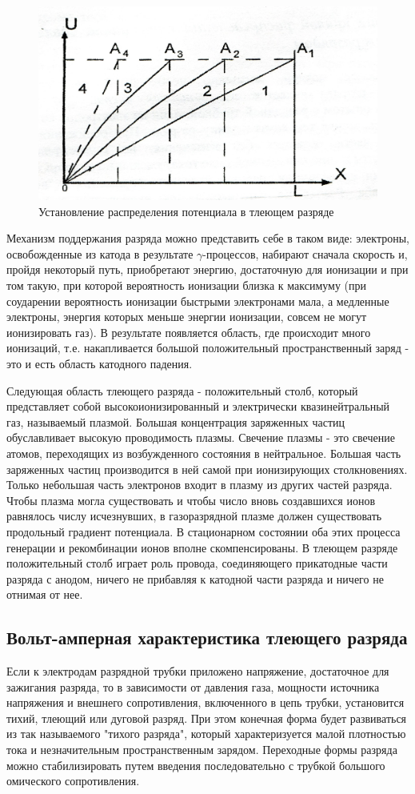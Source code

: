   \begin{figure}[h!]
	\centering
	\includegraphics[width=0.5\linewidth]{fig/img1.jpg}
	\caption{Установление распределения потенциала в тлеющем разряде}
	\label{fig:1}
\end{figure}

Механизм поддержания разряда можно представить себе в таком виде: электроны, освобожденные из катода в результате 
$\gamma$-процессов, набирают сначала скорость и, пройдя некоторый путь, приобретают энергию, достаточную для 
ионизации и при том такую, при которой вероятность ионизации близка к максимуму (при соударении вероятность ионизации 
быстрыми электронами мала, а медленные электроны, энергия которых меньше энергии ионизации, совсем не могут 
ионизировать газ). В результате появляется область, где происходит много ионизаций, т.е. накапливается большой
положительный пространственный заряд - это и есть область катодного падения.

Следующая область тлеющего разряда - положительный столб, который представляет собой высокоионизированный и 
электрически квазинейтральный газ, называемый плазмой. Большая концентрация заряженных частиц обуславливает 
высокую проводимость плазмы. Свечение плазмы - это свечение атомов, переходящих из возбужденного состояния в нейтральное.
Большая часть заряженных частиц производится в ней самой при ионизирующих столкновениях. Только небольшая часть 
электронов входит в плазму из других частей разряда. Чтобы плазма могла существовать и чтобы число вновь создавшихся 
ионов равнялось числу исчезнувших, в газоразрядной плазме должен существовать продольный градиент потенциала. В 
стационарном состоянии оба этих процесса генерации и рекомбинации ионов вполне скомпенсированы. В тлеющем разряде 
положительный столб играет роль провода, соединяющего прикатодные части разряда с анодом, ничего не прибавляя к катодной
части разряда и ничего не отнимая от нее.

\subsection{Вольт-амперная характеристика тлеющего разряда}
Если к электродам разрядной трубки приложено напряжение, достаточное для зажигания разряда, то в зависимости от 
давления газа, мощности источника напряжения и внешнего сопротивления, включенного в цепь трубки, установится тихий,
тлеющий или дуговой разряд. При этом конечная форма будет развиваться из так называемого "тихого разряда", который 
характеризуется малой плотностью тока и незначительным пространственным зарядом. Переходные формы разряда можно 
стабилизировать путем введения последовательно с трубкой большого омического сопротивления.

